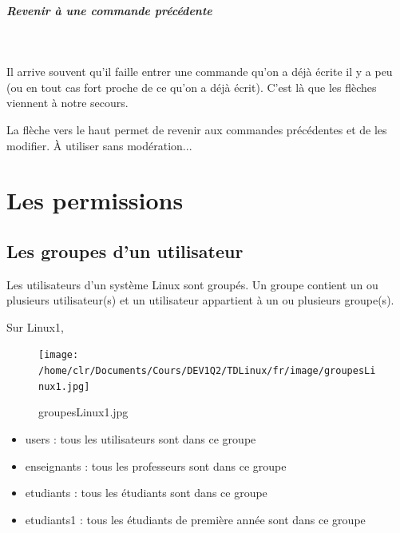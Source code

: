 \documentclass[11pt,a4paper]{article}
\begin{document}
			
		\subparagraph{Revenir \`a une commande pr\'ec\'edente} 
		
					\textcolor{white}{.} \par
				
            \par
          
          Il arrive souvent qu'il faille entrer une commande qu'on a d\'ej\`a \'ecrite il y a peu (ou en tout cas fort proche de ce qu'on a d\'ej\`a \'ecrit). 
          C'est l\`a que les fl\`eches viennent \`a notre secours.  
        
            \par
          
          La fl\`eche vers le haut permet de revenir aux commandes pr\'ec\'edentes et de les modifier. \`A utiliser sans mod\'eration...  
        
            \par
        \section{Les permissions}\subsection{Les groupes d'un utilisateur}
					Les utilisateurs d'un syst\`eme Linux sont group\'es. 
					Un groupe contient un ou plusieurs utilisateur(s) et un utilisateur appartient \`a un ou plusieurs groupe(s).
				
            \par
        
				  Sur Linux1, 
        
            \par
        \begin{figure}[hbt]
				    \begin{center}
					\texttt{[image: /home/clr/Documents/Cours/DEV1Q2/TDLinux/fr/image/groupesLinux1.jpg]}
						\end{center}
                
                    \caption[groupesLinux1.jpg]{groupesLinux1.jpg}
                \end{figure}
                    
            \par
        
					\begin{itemize}
				
			\item users : tous les utilisateurs sont dans ce groupe
			\item enseignants : tous les professeurs sont dans ce groupe
			\item etudiants : tous les \'etudiants sont dans ce groupe
			\item etudiants1 : tous les \'etudiants de premi\`ere ann\'ee sont dans ce groupe
					\end{itemize}
				
\end{document}

